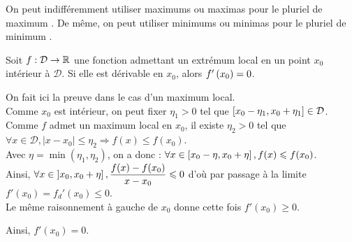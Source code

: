 \documentclass{magnoliaold}
\begin{document}
\begin{remarqueUnique}
\remarque On peut indifféremment utiliser \og maximums \fg ou \og maximas \fg
  pour le pluriel de \og maximum \fg. De même, on peut utiliser \og minimums \fg
  ou \og minimas \fg pour le pluriel de \og minimum \fg.
\end{remarqueUnique}

\begin{proposition}[utile=-3]
Soit $f:\mathcal{D}\to\mathbb{R}$ une fonction admettant un extrémum local en un point $x_0$ intérieur à
$\mathcal{D}$. Si elle est dérivable en $x_0$, alors $f'\left(x_0\right)=0$.
\end{proposition}

\begin{preuve}
On fait ici la preuve dans le cas d'un maximum local.\\
Comme $x_0$ est intérieur, on peut fixer $\eta_1>0$ tel que $\left[x_0-\eta_1,x_0+\eta_1\right] \in \mathcal{D}$. Comme $f$ admet un maximum local en $x_0$, il existe $\eta_2>0$ tel que $\forall x\in \mathcal{D}, |x-x_0|\leq \eta_2 \Longrightarrow f(x)\leq f(x_0)$.\\
Avec $\eta=\min(\eta_1,\eta_2)$, on a donc : $\forall x \in \left[x_0-\eta,x_0+\eta\right], f(x)\leqslant f(x_0)$.\\

Ainsi, $\forall x \in \left]x_0,x_0+\eta\right], \dfrac{f(x)-f(x_0)}{x-x_0}\leqslant 0$ d'où par passage à la limite $f'(x_0)=f_d'(x_0)\leq 0$.\\
Le même raisonnement à gauche de $x_0$ donne cette fois $f'(x_0)\geq 0$.

Ainsi, $f'(x_0)=0$.
\end{preuve}
\end{document}
